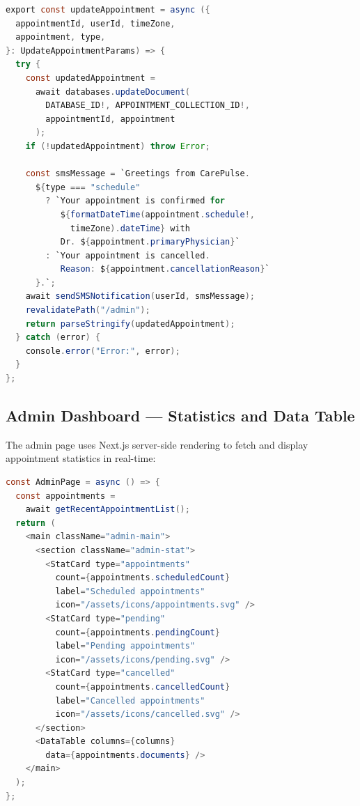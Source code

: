 \documentclass[11pt,a4paper]{article}
\begin{document}
\begin{lstlisting}[language=Java, caption={Appointment Update with SMS Notification}]
export const updateAppointment = async ({
  appointmentId, userId, timeZone,
  appointment, type,
}: UpdateAppointmentParams) => {
  try {
    const updatedAppointment =
      await databases.updateDocument(
        DATABASE_ID!, APPOINTMENT_COLLECTION_ID!,
        appointmentId, appointment
      );
    if (!updatedAppointment) throw Error;

    const smsMessage = `Greetings from CarePulse.
      ${type === "schedule"
        ? `Your appointment is confirmed for
           ${formatDateTime(appointment.schedule!,
             timeZone).dateTime} with
           Dr. ${appointment.primaryPhysician}`
        : `Your appointment is cancelled.
           Reason: ${appointment.cancellationReason}`
      }.`;
    await sendSMSNotification(userId, smsMessage);
    revalidatePath("/admin");
    return parseStringify(updatedAppointment);
  } catch (error) {
    console.error("Error:", error);
  }
};
\end{lstlisting}

\subsection{Admin Dashboard --- Statistics and Data Table}

The admin page uses Next.js server-side rendering to fetch and display appointment statistics in real-time:

\begin{lstlisting}[language=Java, caption={Admin Dashboard with Statistical Aggregation}]
const AdminPage = async () => {
  const appointments =
    await getRecentAppointmentList();
  return (
    <main className="admin-main">
      <section className="admin-stat">
        <StatCard type="appointments"
          count={appointments.scheduledCount}
          label="Scheduled appointments"
          icon="/assets/icons/appointments.svg" />
        <StatCard type="pending"
          count={appointments.pendingCount}
          label="Pending appointments"
          icon="/assets/icons/pending.svg" />
        <StatCard type="cancelled"
          count={appointments.cancelledCount}
          label="Cancelled appointments"
          icon="/assets/icons/cancelled.svg" />
      </section>
      <DataTable columns={columns}
        data={appointments.documents} />
    </main>
  );
};
\end{lstlisting}
\end{document}
